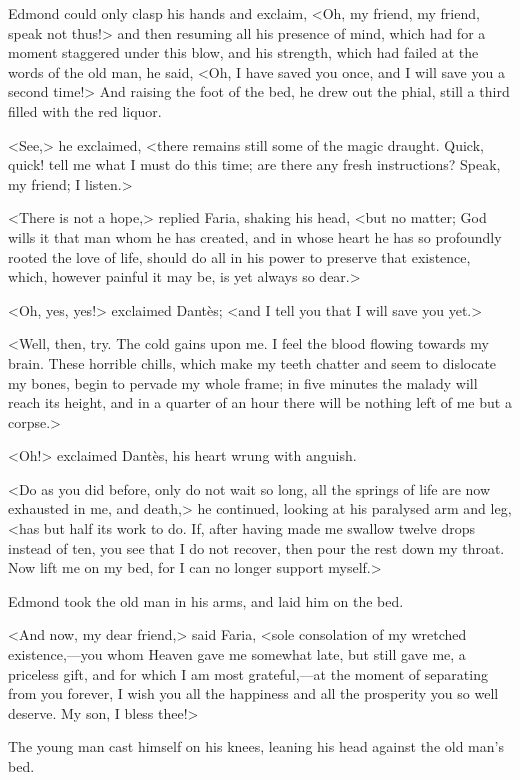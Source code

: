  Edmond could only clasp his hands and exclaim, <Oh, my friend, my friend, speak not thus!> and then resuming all his presence of mind, which had for a moment staggered under this blow, and his strength, which had failed at the words of the old man, he said, <Oh, I have saved you once, and I will save you a second time!> And raising the foot of the bed, he drew out the phial, still a third filled with the red liquor. 

 <See,> he exclaimed, <there remains still some of the magic draught. Quick, quick! tell me what I must do this time; are there any fresh instructions? Speak, my friend; I listen.> 

 <There is not a hope,> replied Faria, shaking his head, <but no matter; God wills it that man whom he has created, and in whose heart he has so profoundly rooted the love of life, should do all in his power to preserve that existence, which, however painful it may be, is yet always so dear.> 

 <Oh, yes, yes!> exclaimed Dantès; <and I tell you that I will save you yet.> 

 <Well, then, try. The cold gains upon me. I feel the blood flowing towards my brain. These horrible chills, which make my teeth chatter and seem to dislocate my bones, begin to pervade my whole frame; in five minutes the malady will reach its height, and in a quarter of an hour there will be nothing left of me but a corpse.> 

 <Oh!> exclaimed Dantès, his heart wrung with anguish. 

 <Do as you did before, only do not wait so long, all the springs of life are now exhausted in me, and death,> he continued, looking at his paralysed arm and leg, <has but half its work to do. If, after having made me swallow twelve drops instead of ten, you see that I do not recover, then pour the rest down my throat. Now lift me on my bed, for I can no longer support myself.> 

 Edmond took the old man in his arms, and laid him on the bed. 

 <And now, my dear friend,> said Faria, <sole consolation of my wretched existence,—you whom Heaven gave me somewhat late, but still gave me, a priceless gift, and for which I am most grateful,—at the moment of separating from you forever, I wish you all the happiness and all the prosperity you so well deserve. My son, I bless thee!> 

 The young man cast himself on his knees, leaning his head against the old man's bed. 

